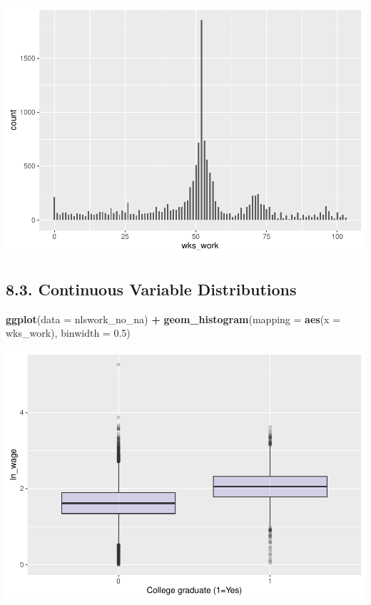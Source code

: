\documentclass[
]{article}
\newenvironment{Shaded}{\begin{snugshade}}{\end{snugshade}}
\newcommand{\AttributeTok}[1]{\textcolor[rgb]{0.13,0.29,0.53}{#1}}
\newcommand{\FloatTok}[1]{\textcolor[rgb]{0.00,0.00,0.81}{#1}}
\newcommand{\FunctionTok}[1]{\textcolor[rgb]{0.13,0.29,0.53}{\textbf{#1}}}
\newcommand{\NormalTok}[1]{#1}
\newcommand{\SpecialCharTok}[1]{\textcolor[rgb]{0.81,0.36,0.00}{\textbf{#1}}}
\begin{document}
\includegraphics{RIntro_files/figure-latex/unnamed-chunk-20-1.pdf}

\hypertarget{continuous-variable-distributions}{%
\subsection{8.3. Continuous Variable
Distributions}\label{continuous-variable-distributions}}

\begin{Shaded}
\begin{Highlighting}[]
\FunctionTok{ggplot}\NormalTok{(}\AttributeTok{data =}\NormalTok{ nlswork\_no\_na) }\SpecialCharTok{+}
  \FunctionTok{geom\_histogram}\NormalTok{(}\AttributeTok{mapping =} \FunctionTok{aes}\NormalTok{(}\AttributeTok{x =}\NormalTok{ wks\_work), }\AttributeTok{binwidth =} \FloatTok{0.5}\NormalTok{)}
\end{Highlighting}
\end{Shaded}

\includegraphics{RIntro_files/figure-latex/unnamed-chunk-21-1.pdf}
\end{document}
